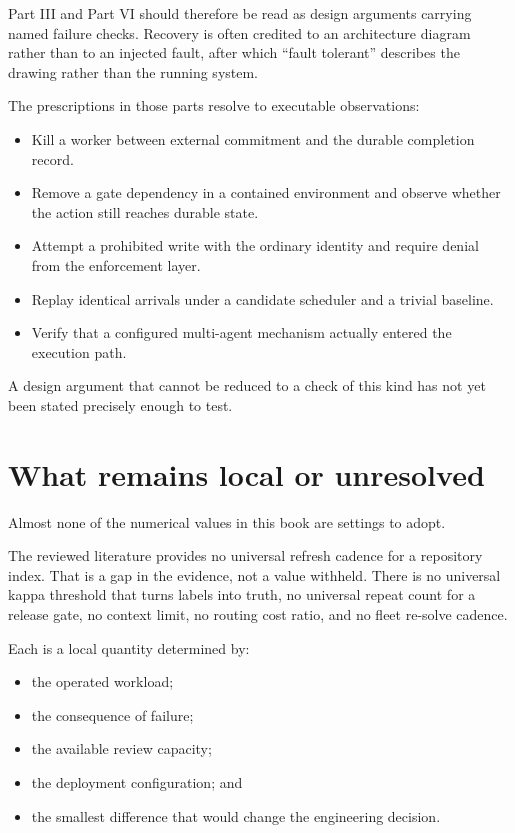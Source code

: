 Part III and Part VI should therefore be read as design arguments carrying named failure checks. Recovery is often credited to an architecture diagram rather than to an injected fault, after which ``fault tolerant'' describes the drawing rather than the running system.

The prescriptions in those parts resolve to executable observations:

\begin{itemize}
\tightlist
\item
  Kill a worker between external commitment and the durable completion record.
\item
  Remove a gate dependency in a contained environment and observe whether the action still reaches durable state.
\item
  Attempt a prohibited write with the ordinary identity and require denial from the enforcement layer.
\item
  Replay identical arrivals under a candidate scheduler and a trivial baseline.
\item
  Verify that a configured multi-agent mechanism actually entered the execution path.
\end{itemize}

A design argument that cannot be reduced to a check of this kind has not yet been stated precisely enough to test.

\section{What remains local or unresolved}\label{what-remains-local-or-unresolved}

Almost none of the numerical values in this book are settings to adopt.

The reviewed literature provides no universal refresh cadence for a repository index. That is a gap in the evidence, not a value withheld. There is no universal kappa threshold that turns labels into truth, no universal repeat count for a release gate, no context limit, no routing cost ratio, and no fleet re-solve cadence.

Each is a local quantity determined by:

\begin{itemize}
\tightlist
\item
  the operated workload;
\item
  the consequence of failure;
\item
  the available review capacity;
\item
  the deployment configuration; and
\item
  the smallest difference that would change the engineering decision.
\end{itemize}

